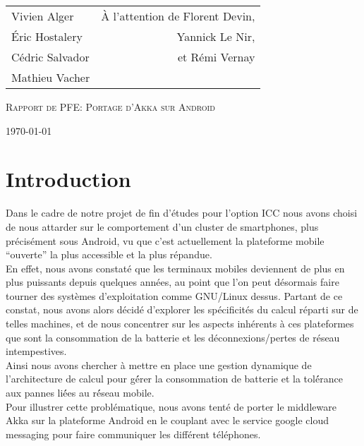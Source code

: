 \documentclass[a4paper,12pt]{report}
\begin{document}
\begin{titlepage}

\addtolength{\oddsidemargin}{-0.15in}
\addtolength{\textwidth}{0.5in}
\addtolength{\topmargin}{-.375in}
\addtolength{\textheight}{0.75in}

\begin{center}

\begin{tabular*}{6in}{l@{\extracolsep{\fill}}r}{Vivien Alger}&{À
    l'attention de Florent Devin,}\\
    {Éric Hostalery}&{Yannick Le Nir,}\\
    {Cédric Salvador}&{et Rémi Vernay}\\
    {Mathieu Vacher}
\end{tabular*}
\vspace*{\fill}

\textsc{\LARGE Rapport de PFE: Portage d'Akka sur Android}\\
\vspace*{\fill}

\today
\end{center}

\end{titlepage}

\tableofcontents
\newpage
  
\section*{Introduction}

Dans le cadre de notre projet de fin d’études pour l’option ICC nous avons choisi 
de nous attarder sur le comportement d’un cluster de smartphones, plus précisément 
sous Android, vu que c’est actuellement la plateforme mobile “ouverte” la plus 
accessible et la plus répandue.\\
En effet, nous avons constaté que les terminaux mobiles deviennent de plus en plus 
puissants depuis quelques années, au point que l’on peut désormais faire tourner des 
systèmes d’exploitation comme GNU/Linux dessus. Partant de ce constat, nous avons alors 
décidé d’explorer les spécificités du calcul réparti sur de telles machines, et de nous 
concentrer sur les aspects inhérents à ces plateformes que sont la consommation de la 
batterie et les déconnexions/pertes de réseau intempestives.\\
Ainsi nous avons chercher à mettre en place une gestion dynamique de l’architecture 
de calcul pour gé́rer la consommation de batterie et la tolé́rance aux pannes lié́es au 
ré́seau mobile.\\
Pour illustrer cette problématique, nous avons tenté de porter le middleware Akka
sur la plateforme Android en le couplant avec le service google cloud messaging
pour faire communiquer les différent téléphones.
\end{document}
